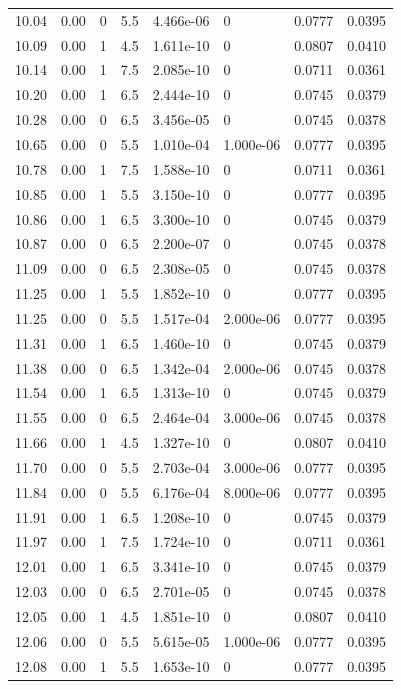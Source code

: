 \documentclass[preview]{standalone}
\begin{document}
{{{\begin{tabular}{L{1.2cm}C{1.2cm} C{0.3cm}C{0.5cm} C{1.4cm}C{1.4cm} C{1.4cm}C{1.4cm}}
  10.04  &  0.00  & 0     & 5.5 &  4.466e-06  & 0  & 0.0777 &  0.0395   \\ 
  10.09  &  0.00  & 1     & 4.5 &  1.611e-10  & 0  & 0.0807 &  0.0410   \\ 
  10.14  &  0.00  & 1     & 7.5 &  2.085e-10  & 0  & 0.0711 &  0.0361   \\ 
  10.20  &  0.00  & 1     & 6.5 &  2.444e-10  & 0  & 0.0745 &  0.0379   \\ 
  10.28  &  0.00  & 0     & 6.5 &  3.456e-05  & 0  & 0.0745 &  0.0378   \\ 
  10.65  &  0.00  & 0     & 5.5 &  1.010e-04  & 1.000e-06  & 0.0777 &  0.0395   \\ 
  10.78  &  0.00  & 1     & 7.5 &  1.588e-10  & 0  & 0.0711 &  0.0361   \\ 
  10.85  &  0.00  & 1     & 5.5 &  3.150e-10  & 0  & 0.0777 &  0.0395   \\ 
  10.86  &  0.00  & 1     & 6.5 &  3.300e-10  & 0  & 0.0745 &  0.0379   \\ 
  10.87  &  0.00  & 0     & 6.5 &  2.200e-07  & 0  & 0.0745 &  0.0378   \\ 
  11.09  &  0.00  & 0     & 6.5 &  2.308e-05  & 0  & 0.0745 &  0.0378   \\ 
  11.25  &  0.00  & 1     & 5.5 &  1.852e-10  & 0  & 0.0777 &  0.0395   \\ 
  11.25  &  0.00  & 0     & 5.5 &  1.517e-04  & 2.000e-06  & 0.0777 &  0.0395   \\ 
  11.31  &  0.00  & 1     & 6.5 &  1.460e-10  & 0  & 0.0745 &  0.0379   \\ 
  11.38  &  0.00  & 0     & 6.5 &  1.342e-04  & 2.000e-06  & 0.0745 &  0.0378   \\ 
  11.54  &  0.00  & 1     & 6.5 &  1.313e-10  & 0  & 0.0745 &  0.0379   \\ 
  11.55  &  0.00  & 0     & 6.5 &  2.464e-04  & 3.000e-06  & 0.0745 &  0.0378   \\ 
  11.66  &  0.00  & 1     & 4.5 &  1.327e-10  & 0  & 0.0807 &  0.0410   \\ 
  11.70  &  0.00  & 0     & 5.5 &  2.703e-04  & 3.000e-06  & 0.0777 &  0.0395   \\ 
  11.84  &  0.00  & 0     & 5.5 &  6.176e-04  & 8.000e-06  & 0.0777 &  0.0395   \\ 
  11.91  &  0.00  & 1     & 6.5 &  1.208e-10  & 0  & 0.0745 &  0.0379   \\ 
  11.97  &  0.00  & 1     & 7.5 &  1.724e-10  & 0  & 0.0711 &  0.0361   \\ 
  12.01  &  0.00  & 1     & 6.5 &  3.341e-10  & 0  & 0.0745 &  0.0379   \\ 
  12.03  &  0.00  & 0     & 6.5 &  2.701e-05  & 0  & 0.0745 &  0.0378   \\ 
  12.05  &  0.00  & 1     & 4.5 &  1.851e-10  & 0  & 0.0807 &  0.0410   \\ 
  12.06  &  0.00  & 0     & 5.5 &  5.615e-05  & 1.000e-06  & 0.0777 &  0.0395   \\ 
  12.08  &  0.00  & 1     & 5.5 &  1.653e-10  & 0  & 0.0777 &  0.0395   \\ 
\hline 
\end{tabular} 

}}}
\end{document}
